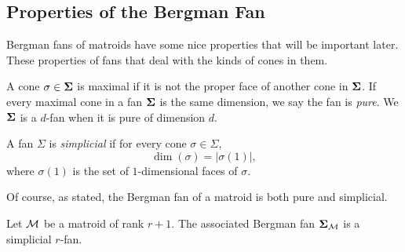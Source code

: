 \documentclass[12pt,oneside]{../../sfsuthesis}
\begin{document}
\subsection{Properties of the Bergman Fan}
Bergman fans of matroids have some nice properties that will be important later.
These properties of fans that deal with the kinds of cones in them.
\begin{definition}[Pure]\th\label{def:pure}
    A cone \(\sigma \in \bm{\Sigma} \) is maximal if it is not the proper face of another cone in \( \bm{\Sigma} \).
    If every maximal cone in a fan \( \bm{\Sigma} \) is the same dimension, we say the fan is \emph{pure}.
    We \( \bm{\Sigma} \) is a \( d \)-fan when it is pure of dimension \( d \).
\end{definition}

\begin{definition}[Simplicial]\th\label{def:simplicial}
    A fan \( \Sigma \) is \emph{simplicial} if for every cone \( \sigma \in \Sigma \),
    \[
        \dim (\sigma)  = |\sigma(1)|,
    \]
    where \( \sigma(1) \) is the set of \( 1 \)-dimensional faces of \( \sigma \).
\end{definition}
Of course, as stated, the Bergman fan of a matroid is both pure and simplicial.
\begin{proposition}\th\label{thm:bergFanSimPure}
    Let \( \mathcal{M} \) be a matroid of rank \( r + 1 \).
    The associated Bergman fan \( \bm{\Sigma}_{\mathcal{M}} \) is a simplicial \( r \)-fan.
\end{proposition}
\end{document}
